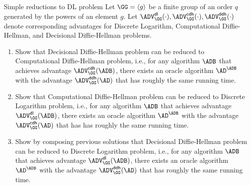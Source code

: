 \documentclass{crypto-exercise}
\author{Sven Laur}
\begin{document}
\begin{exercise}{Simple reductions to DL problem}
  Let $\GG=\langle g\rangle$ be a finite group of an order $q$
  generated by the powers of an element $g$. Let $\ADVDL{\GG}{\cdot},
  \ADVCDH{\GG}{\cdot}, \ADVDDH{\GG}{\cdot}$ denote corresponding
  advantages for Discrete Logarithm, Computational Diffie-Hellman, and
  Decisional Diffie-Hellman problems. 
  \begin{enumerate}
  \item Show that Decisional Diffie-Hellman problem can be reduced to
    Computational Diffie-Hellman problem, i.e., for any algorithm
    $\ADB$ that achieves advantage $\ADVCDH{\GG}{\ADB}$, there exists
    an oracle algorithm $\AD^{\ADB}$ with the advantage
    $\ADVDDH{\GG}{\AD}$ that has roughly the same running time.
  \item Show that Computational Diffie-Hellman problem can be reduced to
    Discrete Logarithm problem, i.e., for any algorithm
    $\ADB$ that achieves advantage $\ADVDL{\GG}{\ADB}$, there exists
    an oracle algorithm $\AD^{\ADB}$ with the advantage
    $\ADVCDH{\GG}{\AD}$ that has has roughly the same running time.
  \item Show by composing previous solutions that Decisional
    Diffie-Hellman problem can be reduced to Discrete Logarithm
    problem, i.e., for any algorithm $\ADB$ that achieves advantage
    $\ADVDL{\GG}{\ADB}$, there exists an oracle algorithm
    $\AD^{\ADB}$ with the advantage $\ADVDDH{\GG}{\AD}$ that has 
    roughly the same running time.
  \end{enumerate}
\end{exercise}
\end{document}

